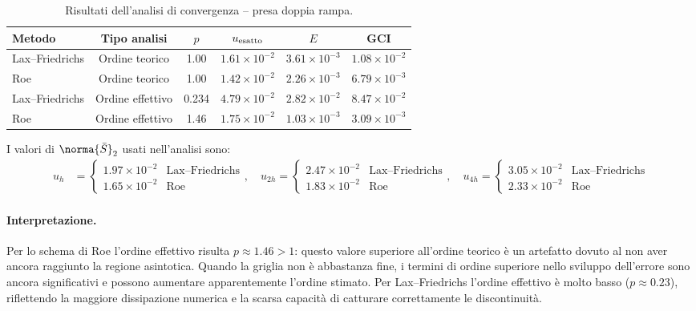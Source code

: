 \begin{table}[H]
  \centering
  \caption{Risultati dell'analisi di convergenza -- presa doppia rampa.}
  \label{tab:presa_convergenza}
  \renewcommand{\arraystretch}{1.25}
  \begin{tabular}{lccccc}
    \toprule
    Metodo & Tipo analisi & $p$ & $u_{\rm esatto}$ & $E$ & GCI \\
    \midrule
    Lax--Friedrichs & Ordine teorico   & 1.00  & $1.61\times10^{-2}$ & $3.61\times10^{-3}$ & $1.08\times10^{-2}$ \\
    Roe             & Ordine teorico   & 1.00  & $1.42\times10^{-2}$ & $2.26\times10^{-3}$ & $6.79\times10^{-3}$ \\
    \midrule
    Lax--Friedrichs & Ordine effettivo & 0.234 & $4.79\times10^{-2}$ & $2.82\times10^{-2}$ & $8.47\times10^{-2}$ \\
    Roe             & Ordine effettivo & 1.46  & $1.75\times10^{-2}$ & $1.03\times10^{-3}$ & $3.09\times10^{-3}$ \\
    \bottomrule
  \end{tabular}
\end{table}

I valori di $\norma{\bar{S}}_2$ usati nell'analisi sono:
\begin{align*}
  u_h   &= \begin{cases} 1.97\times10^{-2} & \text{Lax--Friedrichs} \\
                         1.65\times10^{-2} & \text{Roe}\end{cases}, \quad
  u_{2h} = \begin{cases} 2.47\times10^{-2} & \text{Lax--Friedrichs} \\
                         1.83\times10^{-2} & \text{Roe}\end{cases}, \quad
  u_{4h} = \begin{cases} 3.05\times10^{-2} & \text{Lax--Friedrichs} \\
                         2.33\times10^{-2} & \text{Roe}\end{cases}
\end{align*}

\paragraph{Interpretazione.}
Per lo schema di Roe l'ordine effettivo risulta $p \approx 1.46 > 1$: questo valore superiore
all'ordine teorico è un artefatto dovuto al non aver ancora raggiunto la regione asintotica.
Quando la griglia non è abbastanza fine, i termini di ordine superiore nello sviluppo
dell'errore sono ancora significativi e possono aumentare apparentemente l'ordine stimato.
Per Lax--Friedrichs l'ordine effettivo è molto basso ($p \approx 0.23$), riflettendo la
maggiore dissipazione numerica e la scarsa capacità di catturare correttamente le
discontinuità.

